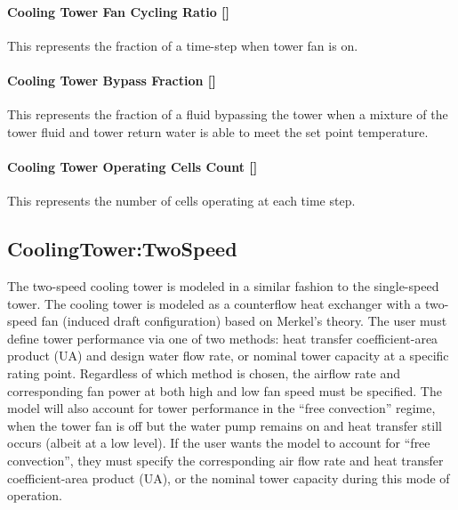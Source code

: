 \paragraph{Cooling Tower Fan Cycling Ratio {[]}}\label{cooling-tower-fan-cycling-ratio}

This represents the fraction of a time-step when tower fan is on.

\paragraph{Cooling Tower Bypass Fraction {[]}}\label{cooling-tower-bypass-fraction}

This represents the fraction of a fluid bypassing the tower when a mixture of the tower fluid and tower return water is able to meet the set point temperature.

\paragraph{Cooling Tower Operating Cells Count {[]}}\label{cooling-tower-operating-cells-count}

This represents the number of cells operating at each time step.

\subsection{CoolingTower:TwoSpeed}\label{coolingtowertwospeed}

The two-speed cooling tower is modeled in a similar fashion to the single-speed tower. The cooling tower is modeled as a counterflow heat exchanger with a two-speed fan (induced draft configuration) based on Merkel's theory. The user must define tower performance via one of two methods: heat transfer coefficient-area product (UA) and design water flow rate, or nominal tower capacity at a specific rating point. Regardless of which method is chosen, the airflow rate and corresponding fan power at both high and low fan speed must be specified. The model will also account for tower performance in the ``free convection'' regime, when the tower fan is off but the water pump remains on and heat transfer still occurs (albeit at a low level). If the user wants the model to account for ``free convection'', they must specify the corresponding air flow rate and heat transfer coefficient-area product (UA), or the nominal tower capacity during this mode of operation.

